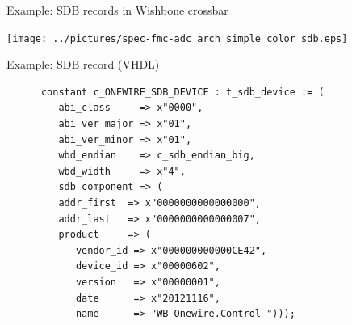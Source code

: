 \documentclass[compress,red]{beamer}
\begin{document}
\begin{frame}{Example: SDB records in Wishbone crossbar}

  \begin{center}
    \texttt{[image: ../pictures/spec-fmc-adc\_arch\_simple\_color\_sdb.eps]}
  \end{center}

  \note[item]{}

\end{frame}

\begin{frame}[fragile]{Example: SDB record (VHDL)} %

  \small
    \begin{verbatim}
      constant c_ONEWIRE_SDB_DEVICE : t_sdb_device := (
         abi_class     => x"0000",
         abi_ver_major => x"01",
         abi_ver_minor => x"01",
         wbd_endian    => c_sdb_endian_big,
         wbd_width     => x"4",
         sdb_component => (
         addr_first  => x"0000000000000000",
         addr_last   => x"0000000000000007",
         product     => (
            vendor_id => x"000000000000CE42",
            device_id => x"00000602",
            version   => x"00000001",
            date      => x"20121116",
            name      => "WB-Onewire.Control ")));
    \end{verbatim}
    \normalsize

    \note[item]{}

\end{frame}

\end{document}
